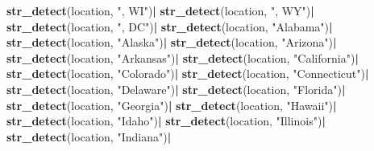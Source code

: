 \documentclass[
]{article}
\newenvironment{Shaded}{\begin{snugshade}}{\end{snugshade}}
\newcommand{\KeywordTok}[1]{\textcolor[rgb]{0.13,0.29,0.53}{\textbf{#1}}}
\newcommand{\NormalTok}[1]{#1}
\newcommand{\OperatorTok}[1]{\textcolor[rgb]{0.81,0.36,0.00}{\textbf{#1}}}
\newcommand{\StringTok}[1]{\textcolor[rgb]{0.31,0.60,0.02}{#1}}
\begin{document}
\begin{Shaded}
\begin{Highlighting}[]
{{\StringTok{                                                  }\KeywordTok{str_detect}\NormalTok{(location, }\StringTok{", WI"}\NormalTok{)}\OperatorTok{|}
\StringTok{                                                  }\KeywordTok{str_detect}\NormalTok{(location, }\StringTok{", WY"}\NormalTok{)}\OperatorTok{|}
\StringTok{                                                  }\KeywordTok{str_detect}\NormalTok{(location, }\StringTok{", DC"}\NormalTok{)}\OperatorTok{|}
\StringTok{                                                  }\KeywordTok{str_detect}\NormalTok{(location, }\StringTok{"Alabama"}\NormalTok{)}\OperatorTok{|}
\StringTok{                                                  }\KeywordTok{str_detect}\NormalTok{(location, }\StringTok{"Alaska"}\NormalTok{)}\OperatorTok{|}
\StringTok{                                                  }\KeywordTok{str_detect}\NormalTok{(location, }\StringTok{"Arizona"}\NormalTok{)}\OperatorTok{|}
\StringTok{                                                  }\KeywordTok{str_detect}\NormalTok{(location, }\StringTok{"Arkansas"}\NormalTok{)}\OperatorTok{|}
\StringTok{                                                  }\KeywordTok{str_detect}\NormalTok{(location, }\StringTok{"California"}\NormalTok{)}\OperatorTok{|}
\StringTok{                                                  }\KeywordTok{str_detect}\NormalTok{(location, }\StringTok{"Colorado"}\NormalTok{)}\OperatorTok{|}
\StringTok{                                                  }\KeywordTok{str_detect}\NormalTok{(location, }\StringTok{"Connecticut"}\NormalTok{)}\OperatorTok{|}
\StringTok{                                                  }\KeywordTok{str_detect}\NormalTok{(location, }\StringTok{"Delaware"}\NormalTok{)}\OperatorTok{|}
\StringTok{                                                  }\KeywordTok{str_detect}\NormalTok{(location, }\StringTok{"Florida"}\NormalTok{)}\OperatorTok{|}
\StringTok{                                                  }\KeywordTok{str_detect}\NormalTok{(location, }\StringTok{"Georgia"}\NormalTok{)}\OperatorTok{|}
\StringTok{                                                  }\KeywordTok{str_detect}\NormalTok{(location, }\StringTok{"Hawaii"}\NormalTok{)}\OperatorTok{|}
\StringTok{                                                  }\KeywordTok{str_detect}\NormalTok{(location, }\StringTok{"Idaho"}\NormalTok{)}\OperatorTok{|}
\StringTok{                                                  }\KeywordTok{str_detect}\NormalTok{(location, }\StringTok{"Illinois"}\NormalTok{)}\OperatorTok{|}
\StringTok{                                                  }\KeywordTok{str_detect}\NormalTok{(location, }\StringTok{"Indiana"}\NormalTok{)}\OperatorTok{|}
}}
\end{Highlighting}
\end{Shaded}
\end{document}
